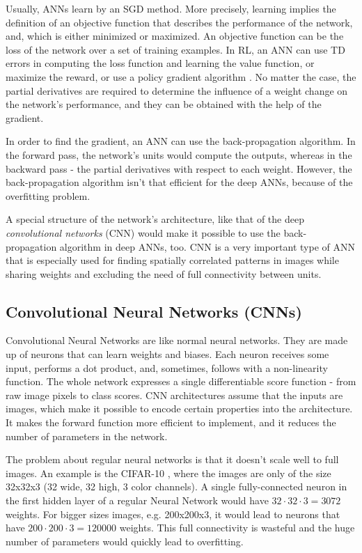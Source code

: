 Usually, ANNs learn by an SGD method. More precisely, learning implies the definition of an objective function that describes the performance of the network, and, which is either minimized or maximized. An objective function can be the loss of the network over a set of training examples. In RL, an ANN can use TD errors in computing the loss function and learning the value function, or maximize the reward, or use a policy gradient algorithm \cite{Sutton}. No matter the case, the partial derivatives are required to determine the influence of a weight change on the network's performance, and they can be obtained with the help of the gradient.

In order to find the gradient, an ANN can use the back-propagation algorithm. In the forward pass, the network's units would compute the outputs, whereas in the backward pass - the partial derivatives with respect to each weight. However, the back-propagation algorithm isn't that efficient for the deep ANNs, because of the overfitting problem.

A special structure of the network's architecture, like that of the deep \textit{convolutional networks} (CNN) would make it possible to use the back-propagation algorithm in deep ANNs, too. CNN is a very important type of ANN that is especially used for finding spatially correlated patterns in images while sharing weights and excluding the need of full connectivity between units.

\subsection{Convolutional Neural Networks (CNNs)} \label{subsectionCNN}

Convolutional Neural Networks are like normal neural networks. They are made up of neurons that can learn weights and biases. Each neuron receives some input, performs a dot product, and, sometimes, follows with a non-linearity function. The whole network expresses a single differentiable score function - from raw image pixels to class scores. CNN architectures assume that the inputs are images, which make it possible to encode certain properties into the architecture. It makes the forward function more efficient to implement, and it reduces the number of parameters in the network. \cite{CNN_course}           

The problem about regular neural networks is that it doesn't scale well to full images. An example is the CIFAR-10 \cite{CIFAR_10}, where the images are only of the size 32x32x3 (32 wide, 32 high, 3 color channels). A single fully-connected neuron in the first hidden layer of a regular Neural Network would have $32\cdot32\cdot3 = 3072$ weights. For bigger sizes images, e.g. 200x200x3, it would lead to neurons that have $200\cdot200\cdot3 = 120000$ weights. This full connectivity is wasteful and the huge number of parameters would quickly lead to overfitting.

